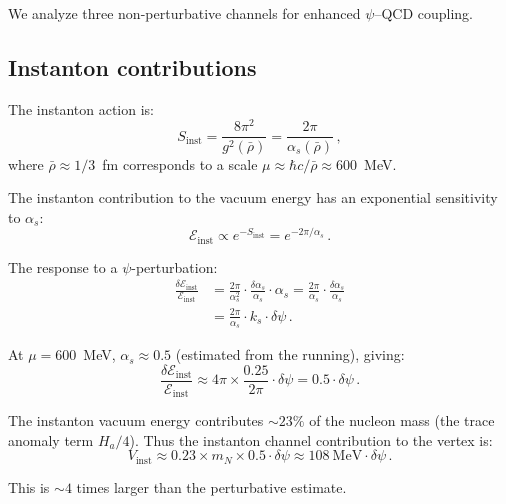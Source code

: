 \documentclass[aps,prd,twocolumn,superscriptaddress,floatfix,nofootinbib]{revtex4-2}
\newcommand{\as}{\alpha_s}
\newcommand{\mN}{m_N}
\newcommand{\ks}{k_s}
\newcommand{\dpsi}{\delta\psi}
\begin{document}
We analyze three non-perturbative channels for enhanced $\psi$--QCD coupling.

\subsection{Instanton contributions}\label{sec:instantons}

The instanton action is:
\begin{equation}
S_{\mathrm{inst}} = \frac{8\pi^2}{g^2(\bar{\rho})} =
\frac{2\pi}{\as(\bar{\rho})} \, ,
\label{eq:S_inst}
\end{equation}
where $\bar{\rho} \approx 1/3$~fm corresponds to a scale $\mu \approx
\hbar c/\bar{\rho} \approx 600$~MeV.

The instanton contribution to the vacuum energy has an exponential
sensitivity to $\as$:
\begin{equation}
\mathcal{E}_{\mathrm{inst}} \propto e^{-S_{\mathrm{inst}}} = e^{-2\pi/\as} \, .
\label{eq:E_inst}
\end{equation}

The response to a $\psi$-perturbation:
\begin{align}
\frac{\delta\mathcal{E}_{\mathrm{inst}}}{\mathcal{E}_{\mathrm{inst}}}
&= \frac{2\pi}{\as^2} \cdot \frac{\delta\as}{\as} \cdot \as
= \frac{2\pi}{\as} \cdot \frac{\delta\as}{\as} \nonumber \\
&= \frac{2\pi}{\as} \cdot \ks \cdot \dpsi \, .
\label{eq:dE_inst}
\end{align}

At $\mu = 600$~MeV, $\as \approx 0.5$ (estimated from the running), giving:
\begin{equation}
\frac{\delta\mathcal{E}_{\mathrm{inst}}}{\mathcal{E}_{\mathrm{inst}}}
\approx 4\pi \times \frac{0.25}{2\pi} \cdot \dpsi
= 0.5 \cdot \dpsi \, .
\label{eq:inst_response}
\end{equation}

The instanton vacuum energy contributes $\sim 23\%$ of the nucleon mass
(the trace anomaly term $H_a/4$). Thus the instanton channel contribution
to the vertex is:
\begin{equation}
V_{\mathrm{inst}} \approx 0.23 \times \mN \times 0.5 \cdot \dpsi
\approx 108~\text{MeV} \cdot \dpsi \, .
\label{eq:V_inst}
\end{equation}

This is $\sim 4$ times larger than the perturbative estimate.
\end{document}
